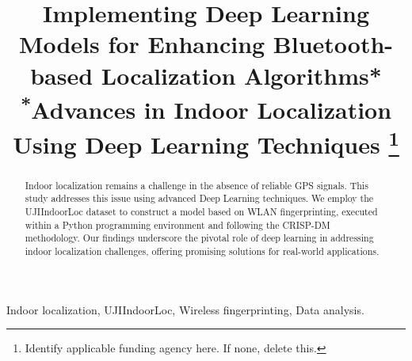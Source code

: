 \documentclass[conference]{IEEEtran}
\begin{document}
\title{Implementing Deep Learning Models for Enhancing Bluetooth-based Localization Algorithms*\\
{\footnotesize \textsuperscript{*}Advances in Indoor Localization Using Deep Learning Techniques}
\thanks{Identify applicable funding agency here. If none, delete this.}
}

\author{
\and
{}
\and
{}
\and
{}
}

\maketitle

\begin{abstract}
Indoor localization remains a challenge in the absence of reliable GPS signals. This study addresses this issue using advanced Deep Learning techniques. We employ the UJIIndoorLoc dataset to construct a model based on WLAN fingerprinting, executed within a Python programming environment and following the CRISP-DM methodology. Our findings underscore the pivotal role of deep learning in addressing indoor localization challenges, offering promising solutions for real-world applications.
\end{abstract}

\begin{IEEEkeywords}
Indoor localization, UJIIndoorLoc, Wireless fingerprinting, Data analysis.
\end{IEEEkeywords}
\end{document}
